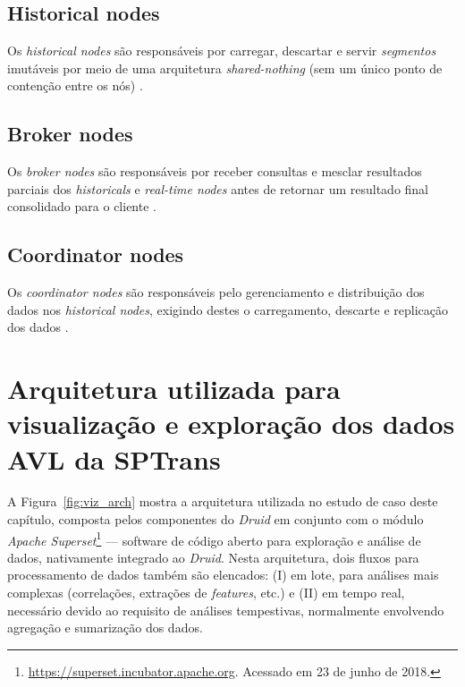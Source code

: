 \documentclass[
	12pt,				%
	oneside,			%
	a4paper,			%
	english,			%
	brazil				%
	]{abntex2ppgsi}
\begin{document}
{{{\subsection{Historical nodes}

Os \textit{historical nodes} são responsáveis por carregar, descartar e servir \emph{segmentos} imutáveis por meio de uma arquitetura \textit{shared-nothing} (sem um único ponto de contenção entre os nós) \cite{yang2014druid}.

\subsection{Broker nodes}

Os \textit{broker nodes} são responsáveis por receber consultas e mesclar resultados parciais dos \textit{historicals} e \textit{real-time nodes} antes de retornar um resultado final consolidado para o cliente \cite{yang2014druid}.

\subsection{Coordinator nodes}

Os \textit{coordinator nodes} são responsáveis pelo gerenciamento e distribuição dos dados nos \textit {historical nodes}, exigindo destes o carregamento, descarte e replicação dos dados \cite{yang2014druid}.

\section{Arquitetura utilizada para visualização e exploração dos dados AVL da SPTrans}
\label{arch_viz}

A Figura~\ref{fig:viz_arch} mostra a arquitetura utilizada no estudo de caso deste capítulo, composta pelos componentes do \textit{Druid} em conjunto com o módulo \textit {Apache Superset}\footnote{\url{https://superset.incubator.apache.org}. Acessado em 23 de junho de 2018.} --- software de código aberto para exploração e análise de dados, nativamente integrado ao \textit{Druid}. Nesta arquitetura, dois fluxos para processamento de dados também são elencados: (I) em lote, para análises mais complexas (correlações, extrações de \textit{features}, etc.) e (II) em tempo real, necessário devido ao requisito de análises tempestivas, normalmente envolvendo agregação e sumarização dos dados. 

}}}
\end{document}
